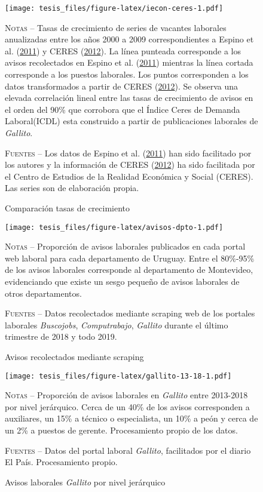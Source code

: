 \documentclass[12pt,oneside]{reedthesis}
\makeatletter
\def\maxwidth{ %
  \ifdim\Gin@nat@width>\linewidth
    \linewidth
  \else
    \Gin@nat@width
  \fi
}
\makeatother
\begin{document}
\begin{figure}
\texttt{[image: tesis\_files/figure-latex/iecon-ceres-1.pdf]}
\caption{Comparación tasas de crecimiento}\label{fig:iecon-ceres}\textsc{}

\footnotesize\textsc{Notas} -- Tasas de crecimiento de series de vacantes laborales anualizadas entre los años 2000 a 2009 correspondientes a Espino et al. (\protect\hyperlink{ref-Alma2011}{2011}) y CERES (\protect\hyperlink{ref-Ceres2012}{2012}). La línea punteada corresponde a los avisos recolectados en Espino et al. (\protect\hyperlink{ref-Alma2011}{2011}) mientras la línea cortada corresponde a los puestos laborales. Los puntos corresponden a los datos transformados a partir de CERES (\protect\hyperlink{ref-Ceres2012}{2012}). Se observa una elevada correlación lineal entre las tasas de crecimiento de avisos en el orden del 90\% que corrobora que el Índice Ceres de Demanda Laboral(ICDL) esta construido a partir de publicaciones laborales de \textit{Gallito}.

\textsc{Fuentes} -- Los datos de Espino et al. (\protect\hyperlink{ref-Alma2011}{2011}) han sido facilitado por los autores y la información de CERES (\protect\hyperlink{ref-Ceres2012}{2012}) ha sido facilitada por el Centro de Estudios de la Realidad Económica y Social (CERES). Las series son de elaboración propia.
\end{figure}
\begin{figure}
\texttt{[image: tesis\_files/figure-latex/avisos-dpto-1.pdf]}
\caption{Avisos recolectados mediante scraping}\label{fig:avisos-dpto}\textsc{}

\footnotesize\textsc{Notas} -- Proporción de avisos laborales publicados en cada portal web laboral para cada departamento de Uruguay. Entre el 80\%-95\% de los avisos laborales corresponde al departamento de Montevideo, evidenciando que existe un sesgo pequeño de avisos laborales de otros departamentos.

\textsc{Fuentes} -- Datos recolectados mediante scraping web de los portales laborales \textit{Buscojobs}, \textit{Computrabajo}, \textit{Gallito} durante el último trimestre de 2018 y todo 2019.
\end{figure}
\begin{figure}
\texttt{[image: tesis\_files/figure-latex/gallito-13-18-1.pdf]}
\caption{Avisos laborales \textit{Gallito} por nivel jerárquico}\label{fig:gallito-13-18}\textsc{}

\footnotesize\textsc{Notas} -- Proporción de avisos laborales en \textit{Gallito} entre 2013-2018 por nivel jerárquico. Cerca de un 40\% de los avisos corresponden a auxiliares, un 15\% a técnico o especialista, un 10\% a peón y cerca de un 2\% a puestos de gerente. Procesamiento propio de los datos.

\textsc{Fuentes} -- Datos del portal laboral \textit{Gallito}, facilitados por el diario El País. Procesamiento propio.
\end{figure}
\newpage
\end{document}
